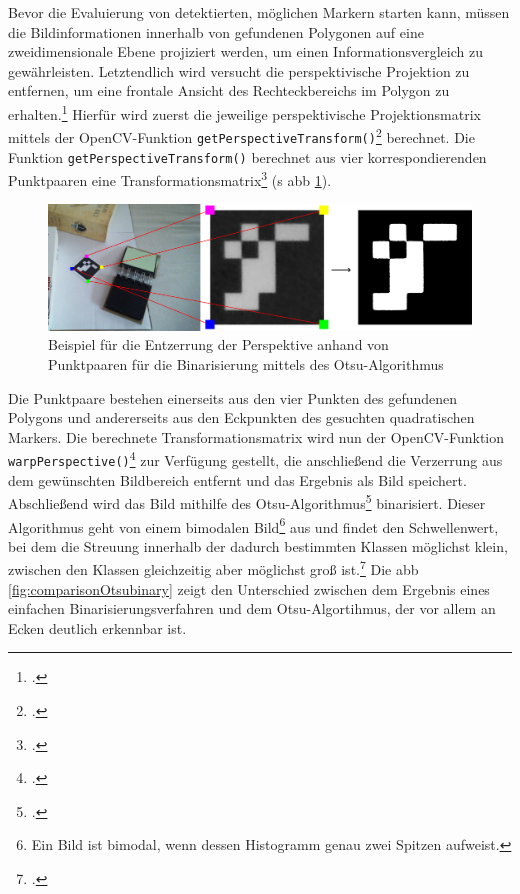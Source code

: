 \noindent Bevor die Evaluierung von detektierten, möglichen Markern starten kann, müssen die Bildinformationen innerhalb von gefundenen Polygonen auf eine zweidimensionale Ebene projiziert werden, um einen Informationsvergleich zu gewährleisten. Letztendlich wird versucht die perspektivische Projektion zu entfernen, um eine frontale Ansicht des Rechteckbereichs im Polygon zu erhalten.\footcite[Vgl.][\ac{S}. 70]{Baggio2012} Hierfür wird zuerst die jeweilige perspektivische Projektionsmatrix mittels der OpenCV-Funktion \texttt{getPerspectiveTransform()}\footcite{opencvgetPerspectiveTransform} berechnet. Die Funktion \texttt{getPerspectiveTransform()} berechnet aus vier korrespondierenden Punktpaaren eine Transformationsmatrix\footcite{opencvgetPerspectiveTransform} (\acs{s} \acs{abb} \ref{fig:Warping}).

\begin{figure}[H]
\centering
\includegraphics[width=15cm]{Bilder/Implementierung/warping.png}
\caption{Beispiel für die Entzerrung der Perspektive anhand von Punktpaaren für die Binarisierung mittels des Otsu-Algorithmus}
\label{fig:Warping}
\end{figure}

\noindent Die Punktpaare bestehen einerseits aus den vier Punkten des gefundenen Polygons und andererseits aus den Eckpunkten des gesuchten quadratischen Markers. Die berechnete Transformationsmatrix wird nun der OpenCV-Funktion \texttt{warpPerspective()}\footcite{opencvwarpPerspective} zur Verfügung gestellt, die anschließend die Verzerrung aus dem gewünschten Bildbereich entfernt und das Ergebnis als Bild speichert. Abschließend wird das Bild mithilfe des Otsu-Algorithmus\footcite{AdaptiveThresholdingDescription} binarisiert. Dieser Algorithmus geht von einem bimodalen Bild\footnote{Ein Bild ist bimodal, wenn dessen Histogramm genau zwei Spitzen aufweist.} aus und findet den Schwellenwert, bei dem die Streuung innerhalb der dadurch bestimmten Klassen möglichst klein, zwischen den Klassen gleichzeitig aber möglichst groß ist.\footcite{Otsu1979} Die \acs{abb} \ref{fig:comparisonOtsubinary} zeigt den Unterschied zwischen dem Ergebnis eines einfachen Binarisierungsverfahren und dem Otsu-Algortihmus, der vor allem an Ecken deutlich erkennbar ist.

